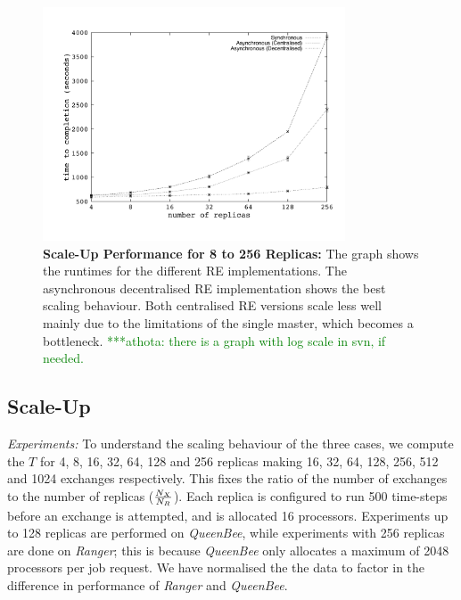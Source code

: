 \documentclass{rspublic}
\newcommand{\alnote}[1]{ {\textcolor{blue} { ***andre: #1 }}}
\newcommand{\athotanote}[1]{ {\textcolor{green} { ***athota: #1 }}}
\newcommand{\alnote}[1]{}
\newcommand{\athotanote}[1]{}
\begin{document}
%
\begin{figure}
\centering
\includegraphics[width=0.8\textwidth]{../data/scale_up.pdf}
\caption{\small \textbf{Scale-Up Performance for 8 to 256 Replicas:}
  The graph shows the runtimes for the different RE implementations.
  The asynchronous decentralised RE implementation shows the best
  scaling behaviour. Both centralised RE versions scale less well
  mainly due to the limitations of the single master, which becomes a
  bottleneck.\athotanote{there is a graph with log scale in svn, if needed.} }
\label{fig:scaleup}
\vspace{-1em}
\end{figure}


\subsection{Scale-Up}


{\it Experiments: } To understand the scaling behaviour of the three
cases, we compute the $T$ for 4, 8, 16, 32, 64, 128 and 256 replicas
making 16, 32, 64, 128, 256, 512 and 1024 exchanges respectively. This
fixes the ratio of the number of exchanges to the number of replicas
($N_X \over N_R$).  Each replica is configured to run 500 time-steps
before an exchange is attempted, and is allocated 16
processors. Experiments up to 128 replicas are performed on {\it
  QueenBee}, while experiments with 256 replicas are done on
\emph{Ranger}; this is because \emph{QueenBee} only allocates a
maximum of 2048 processors per job request. We have normalised the the
data to factor in the difference in performance of {\it Ranger} and
{\it QueenBee}.
\end{document}
